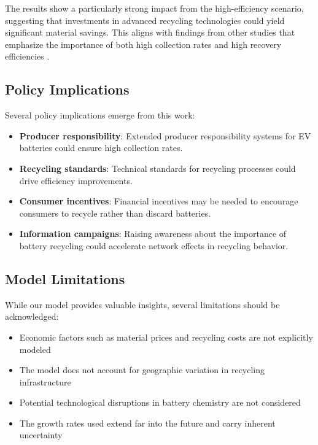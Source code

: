 \documentclass[10pt,a4paper,twocolumn]{article}
\begin{document}
The results show a particularly strong impact from the high-efficiency scenario, suggesting that investments in advanced recycling technologies could yield significant material savings. This aligns with findings from other studies that emphasize the importance of both high collection rates and high recovery efficiencies \citep{yang2021}.

\subsection{Policy Implications}

Several policy implications emerge from this work:

\begin{itemize}
    \item \textbf{Producer responsibility}: Extended producer responsibility systems for EV batteries could ensure high collection rates.
    \item \textbf{Recycling standards}: Technical standards for recycling processes could drive efficiency improvements.
    \item \textbf{Consumer incentives}: Financial incentives may be needed to encourage consumers to recycle rather than discard batteries.
    \item \textbf{Information campaigns}: Raising awareness about the importance of battery recycling could accelerate network effects in recycling behavior.
\end{itemize}

\subsection{Model Limitations}

While our model provides valuable insights, several limitations should be acknowledged:

\begin{itemize}
    \item Economic factors such as material prices and recycling costs are not explicitly modeled
    \item The model does not account for geographic variation in recycling infrastructure
    \item Potential technological disruptions in battery chemistry are not considered
    \item The growth rates used extend far into the future and carry inherent uncertainty
\end{itemize}
\end{document}
